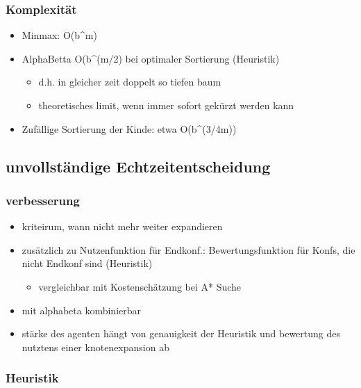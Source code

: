 \documentclass[]{article}
\begin{document}
\hypertarget{header-n989}{%
\subsubsection{Komplexität}\label{header-n989}}

\begin{itemize}
\item
  Minmax: O(b\^{}m)
\item
  AlphaBetta O(b\^{}(m/2) bei optimaler Sortierung (Heuristik)

  \begin{itemize}
  \item
    d.h. in gleicher zeit doppelt so tiefen baum
  \item
    theoretisches limit, wenn immer sofort gekürzt werden kann
  \end{itemize}
\item
  Zufällige Sortierung der Kinde: etwa O(b\^{}(3/4m))
\end{itemize}

\hypertarget{header-n1433}{%
\subsection{unvollständige Echtzeitentscheidung}\label{header-n1433}}

\hypertarget{header-n1436}{%
\subsubsection{verbesserung}\label{header-n1436}}

\begin{itemize}
\item
  kriteirum, wann nicht mehr weiter expandieren
\item
  zusätzlich zu Nutzenfunktion für Endkonf.: Bewertungsfunktion für
  Konfs, die nicht Endkonf sind (Heuristik)

  \begin{itemize}
  \item
    vergleichbar mit Kostenschätzung bei A* Suche
  \end{itemize}
\item
  mit alphabeta kombinierbar
\item
  stärke des agenten hängt von genauigkeit der Heuristik und bewertung
  des nutztens einer knotenexpansion ab
\end{itemize}

\hypertarget{header-n1470}{%
\subsubsection{Heuristik}\label{header-n1470}}
\end{document}
